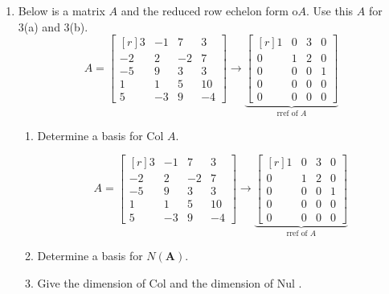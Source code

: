 \documentclass[basic]{inVerba-notes}
\begin{document}
\begin{enumerate}[align=left, leftmargin=0pt, labelindent=\parindent, listparindent=\parindent, labelwidth=0pt, itemindent=!]
  \newpage

  \item Below is a matrix \(A\) and the reduced row echelon form o\(A\). Use this \(A\) for 3(a) and 3(b).
    \[
    A=
    \begin{bmatrix*}[r]
    3 & -1 & 7 & 3 \\
    -2 & 2 & -2 & 7 \\
    -5 & 9 & 3 & 3 \\
    1 & 1 & 5 & 10 \\
    5 & -3 & 9 & -4
    \end{bmatrix*} 
    \rightarrow
    \underbrace{
    \begin{bmatrix*}[r]
    1 & 0 & 3 & 0 \\
    0 & 1 & 2 & 0 \\
    0 & 0 & 0 & 1 \\
    0 & 0 & 0 & 0 \\
    0 & 0 & 0 & 0
    \end{bmatrix*}
    }_{\text{rref of }A}
    \]
  \begin{enumerate}
    \item {} Determine a basis for Col \(A\). 
    
    \newpage
    
    \[
      A=
      \begin{bmatrix*}[r]
        3 & -1 & 7 & 3 \\
        -2 & 2 & -2 & 7 \\
        -5 & 9 & 3 & 3 \\
        1 & 1 & 5 & 10 \\
        5 & -3 & 9 & -4
      \end{bmatrix*} 
      \rightarrow
      \underbrace{
        \begin{bmatrix*}[r]
          1 & 0 & 3 & 0 \\
          0 & 1 & 2 & 0 \\
          0 & 0 & 0 & 1 \\
          0 & 0 & 0 & 0 \\
          0 & 0 & 0 & 0
        \end{bmatrix*}
        }_{\text{rref of }A}
        \]
      \item {} Determine a basis for \(N(\bm{A})\).
      \item {} Give the dimension of Col  and the dimension of Nul .
    \end{enumerate}

    \newpage


\end{enumerate}
\end{document}
